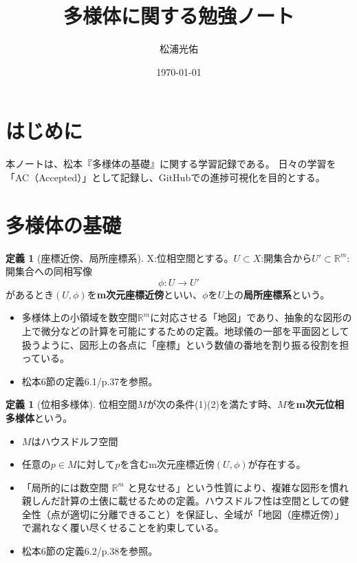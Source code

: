 \documentclass[paper=a4, fontsize=11pt]{jlreq} %
\title{多様体に関する勉強ノート}
\author{松浦光佑}
\date{\today}
\theoremstyle{definition}
\newtheorem{definition}[theorem]{定義}
\begin{document}
\maketitle
\tableofcontents %

\section{はじめに}
本ノートは、松本『多様体の基礎』に関する学習記録である。
日々の学習を「AC（Accepted）」として記録し、GitHubでの進捗可視化を目的とする。

\section{多様体の基礎}
\begin{definition}[座標近傍、局所座標系]
    X:位相空間とする。$U\subset X$:開集合から$U'\subset\mathbb{R}^{m}$:開集合への同相写像
    \[
    \phi : U \to U'
    \]
    があるとき$(U,\phi)$を\textbf{m次元座標近傍}といい、$\phi$を$U$上の\textbf{局所座標系}という。
    \begin{itemize}
        \item[\textbf{Insight:}] 多様体上の小領域を数空間$\mathbb{R}^{m}$に対応させる「地図」であり、抽象的な図形の上で微分などの計算を可能にするための定義。地球儀の一部を平面図として扱うように、図形上の各点に「座標」という数値の番地を割り振る役割を担っている。
        \item[\textbf{Link:}] 松本6節の定義6.1/p.37を参照。
    \end{itemize}
\end{definition}

\begin{definition}[位相多様体]
    位相空間$M$が次の条件(1)(2)を満たす時、$M$を\textbf{m次元位相多様体}という。
    \begin{itemize}
        \item[(1)] $M$はハウスドルフ空間
        \item[(2)] 任意の$p\in M$に対して$p$を含むm次元座標近傍$(U,\phi)$が存在する。
    \end{itemize}
    \begin{itemize}
        \item[\textbf{Insight:}] 「局所的には数空間 $\mathbb{R}^m$ と見なせる」という性質により、複雑な図形を慣れ親しんだ計算の土俵に載せるための定義。ハウスドルフ性は空間としての健全性（点が適切に分離できること）を保証し、全域が「地図（座標近傍）」で漏れなく覆い尽くせることを約束している。
        \item[\textbf{Link:}] 松本6節の定義6.2/p.38を参照。
    \end{itemize}
\end{definition}
\end{document}
